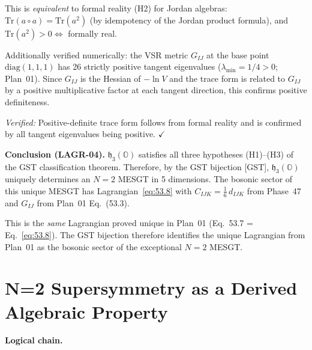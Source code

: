 \begin{enumerate}
    This is \emph{equivalent} to formal reality (H2) for Jordan algebras:
    $\mathrm{Tr}(a \circ a) = \mathrm{Tr}(a^2)$ (by idempotency of the
    Jordan product formula), and $\mathrm{Tr}(a^2) > 0 \Leftrightarrow$
    formally real.

    Additionally verified numerically: the VSR metric $G_{IJ}$ at the
    base point $\mathrm{diag}(1,1,1)$ has 26 strictly positive tangent
    eigenvalues ($\lambda_{\min} = 1/4 > 0$; Plan~01).
    Since $G_{IJ}$ is the Hessian of $-\ln V$ and the trace form
    is related to $G_{IJ}$ by a positive multiplicative factor at
    each tangent direction, this confirms positive definiteness.

    \textit{Verified:} Positive-definite trace form follows from
    formal reality and is confirmed by all tangent eigenvalues
    being positive. $\checkmark$
\end{enumerate}

\medskip

\textbf{Conclusion (LAGR-04).} $\mathfrak{h}_3(\mathbb{O})$ satisfies
all three hypotheses (H1)--(H3) of the GST classification theorem.
Therefore, by the GST bijection [GST], $\mathfrak{h}_3(\mathbb{O})$
uniquely determines an $N=2$ MESGT in 5 dimensions. The bosonic sector
of this unique MESGT has Lagrangian~\eqref{eq:53.8} with
$C_{IJK} = \frac{1}{6}\,d_{IJK}$ from Phase~47 and $G_{IJ}$ from
Plan~01 Eq.~(53.3).

This is the \emph{same} Lagrangian proved unique in Plan~01
(Eq.~53.7 = Eq.~\eqref{eq:53.8}). The GST bijection therefore
identifies the unique Lagrangian from Plan~01 as the bosonic sector
of the exceptional $N=2$ MESGT.



\section{N=2 Supersymmetry as a Derived Algebraic Property}

\textbf{Logical chain.}

